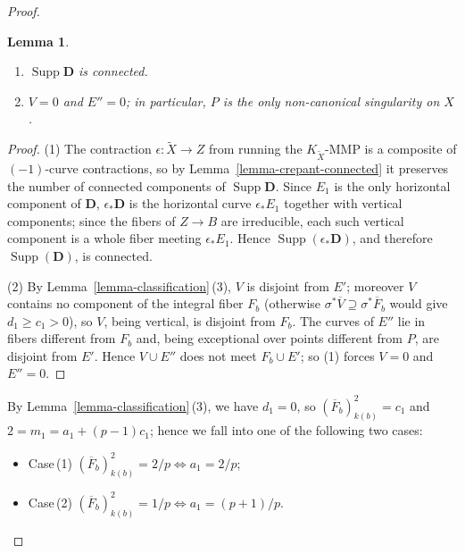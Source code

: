\documentclass[reqno,oneside]{amsart}
\newtheorem{lemma}[theorem]{Lemma}
\theoremstyle{definition}
\theoremstyle{plain}
\numberwithin{equation}{section}
\newcommand\Supp{\operatorname{Supp}}
\begin{document}
\begin{proof}
\begin{lemma}\label{lemma-D-is-connected}%
  \begin{enumerate}[\rm(1)]
    \item $\Supp\mathbf D$ is connected.
    \item $V=0$ and $E''=0$; in particular, $P$ is the only non-canonical singularity on $X$.
  \end{enumerate}
\end{lemma}
\begin{proof}
  (1) The contraction $\epsilon\colon\widetilde X\to Z$ from running the $K_{\widetilde X}$-MMP is a composite of $(-1)$-curve contractions, so by Lemma~\ref{lemma-crepant-connected} it preserves the number of connected components of $\Supp\mathbf D$.
  Since $E_1$ is the only horizontal component of $\mathbf D$, $\epsilon_*\mathbf D$ is the horizontal curve $\epsilon_*E_1$ together with vertical components; since the fibers of $Z\to B$ are irreducible, each such vertical component is a whole fiber meeting $\epsilon_*E_1$. Hence $\Supp(\epsilon_*\mathbf D)$, and therefore $\Supp(\mathbf D)$, is connected.

  (2) By Lemma~\ref{lemma-classification}\,(3), $V$ is disjoint from $E'$; moreover $V$ contains no component of the integral fiber $F_b$ (otherwise $\sigma^*\overline V\supseteq\sigma^*\overline F_b$ would give $d_1\ge c_1>0$), so $V$, being vertical, is disjoint from $F_b$.
  The curves of $E''$ lie in fibers different from $F_b$ and, being exceptional over points different from $P$, are disjoint from $E'$.
  Hence $V\cup E''$ does not meet $F_b\cup E'$; so (1) forces $V = 0$ and $E'' = 0$.
\end{proof}

By Lemma~\ref{lemma-classification}\,(3), we have $d_1=0$, so $(\overline F_b)^2_{k(b)}=c_1$ and $2 = m_1 =a_1+(p-1)c_1$; hence we fall into one of the following two cases:
\begin{itemize}
  \item Case\,(1) $(\overline F_b)^2_{k(b)}=2/p\iff a_1=2/p$;
  \item Case\,(2) $(\overline F_b)^2_{k(b)}=1/p\iff a_1=(p+1)/p$.
\end{itemize}


\end{proof}
\end{document}

